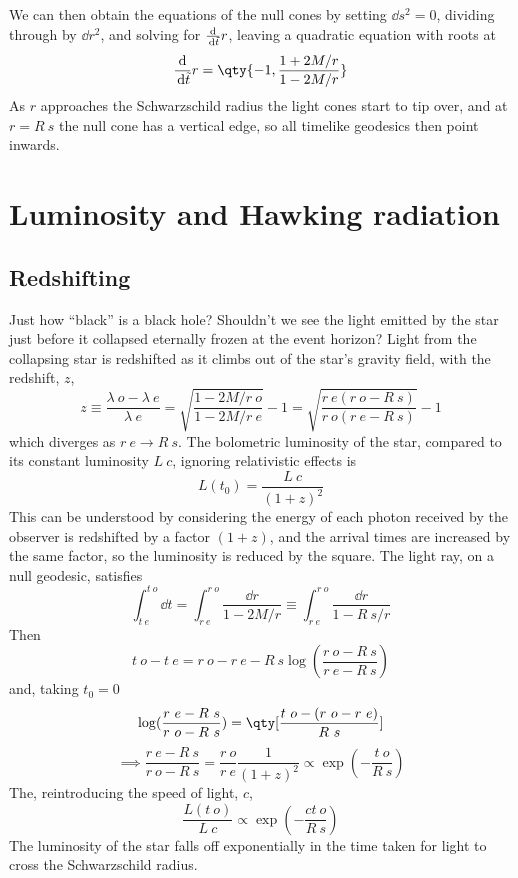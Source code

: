 We can then obtain the equations of the null cones by setting
$\dd{s}^2=0$, dividing through by $\dd{r}^2$, and solving for
$\frac{\mathrm{d}}{\,\mathrm{d} \tilde{t}}{r}$, leaving a quadratic equation with roots at
\begin{equation}
  \label{eq:236}
  \dv{\tilde{t}}{r} = \qty{-1, \frac{1 + 2M/r}{1-2M/r}}
\end{equation}
As $r$ approaches the Schwarzschild radius the light cones start to
tip over, and at $r=R~s$ the null cone has a vertical edge, so all
timelike geodesics then point inwards.

\section{Luminosity and Hawking radiation}
\label{sec:luminosity}

\subsection{Redshifting}
\label{sec:redshifting}

Just how ``black'' is a black hole? Shouldn't we see the light emitted
by the star just before it collapsed eternally frozen at the event
horizon? Light from the collapsing star is redshifted as it climbs out
of the star's gravity field, with the redshift, $z$, 
\begin{equation}
  \label{eq:237}
  z \equiv \frac{\lambda~o - \lambda~e}{\lambda~e} = \sqrt{\frac{1 - 2M/r~o}{1-2M/r~e}} -1  = \sqrt{\frac{r~e (r~o-R~s)}{r~o (r~e - R~s)}} - 1
\end{equation}
which diverges as $r~e \to R~s$. The bolometric luminosity of the
star, compared to its constant luminosity $L~c$, ignoring relativistic
effects is
\[ L(t_0) = \frac{L~c}{(1+z)^2} \] This can be understood by
considering the energy of each photon received by the observer is
redshifted by a factor $(1+z)$, and the arrival times are increased by
the same factor, so the luminosity is reduced by the square. The light
ray, on a null geodesic, satisfies
\[ \int_{t~e}^{t~o} \dd{t} = \int_{r~e}^{r~o} \frac{\dd{r}}{1-2M/r} \equiv  \int_{r~e}^{r~o} \frac{\dd{r}}{1-R~s/r} \]
Then
\[ t~o - t~e = r~o - r~e - R~s \log( \frac{r~o - R~s}{r~e - R~s} ) \]
and, taking $t_0 = 0$
\[ \log( \frac{r~e - R~s}{r~o - R~s} ) = \qty[\frac{t~o - (r~o - r~e)}{R~s}]\]
\[ \implies \frac{r~e - R~s}{r~o - R~s} =
\frac{r~o}{r~e}\frac{1}{(1+z)^2} \propto \exp( - \frac{t~o}{R~s} ) \]
The, reintroducing the speed of light, $c$,
\[ \frac{L(t~o)}{L~c} \propto \exp( - \frac{c t~o}{R~s} ) \] The
luminosity of the star falls off exponentially in the time taken for
light to cross the Schwarzschild radius.

